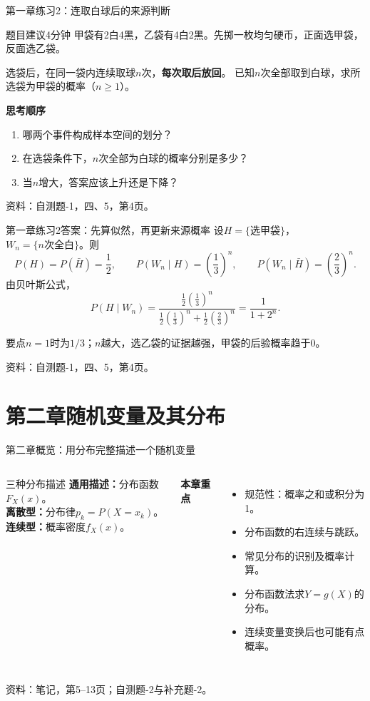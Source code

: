 \documentclass[aspectratio=169,10pt]{beamer}
\newcommand{\source}[1]{\vfill{\color{Muted}\fontsize{6.5}{8}\selectfont 资料：#1\par}}
\newcommand{\key}[1]{\begin{block}{要点}#1\end{block}}
\begin{document}
\begin{frame}[t]{第一章练习2：连取白球后的来源判断}
\begin{block}{题目\quad 建议4分钟}
甲袋有2白4黑，乙袋有4白2黑。先掷一枚均匀硬币，正面选甲袋，反面选乙袋。

选袋后，在同一袋内连续取球$n$次，\textbf{每次取后放回}。
已知$n$次全部取到白球，求所选袋为甲袋的概率（$n\ge1$）。
\end{block}
\vspace{2mm}
\textbf{思考顺序}
\begin{enumerate}
\item 哪两个事件构成样本空间的划分？
\item 在选袋条件下，$n$次全部为白球的概率分别是多少？
\item 当$n$增大，答案应该上升还是下降？
\end{enumerate}
\source{自测题-1，四、5，第4页。}
\end{frame}

\begin{answerframe}{第一章练习2答案：先算似然，再更新来源概率}
设$H=\{\text{选甲袋}\}$，$W_n=\{n\text{次全白}\}$。则
\[
P(H)=P(\bar H)=\frac12,\qquad
P(W_n\mid H)=\left(\frac13\right)^n,\qquad
P(W_n\mid\bar H)=\left(\frac23\right)^n.
\]
由贝叶斯公式，
\[
P(H\mid W_n)=\frac{\frac12(\frac13)^n}{\frac12(\frac13)^n+\frac12(\frac23)^n}
=\boxed{\frac1{1+2^n}}.
\]
\key{$n=1$时为$1/3$；$n$越大，选乙袋的证据越强，甲袋的后验概率趋于0。}
\source{自测题-1，四、5，第4页。}
\end{answerframe}

\section{第二章\quad 随机变量及其分布}

\begin{frame}[t]{第二章概览：用分布完整描述一个随机变量}
\begin{columns}[T]
\begin{block}{三种分布描述}
\textbf{通用描述：}分布函数$F_X(x)$。\\[3mm]
\textbf{离散型：}分布律$p_k=P(X=x_k)$。\\[3mm]
\textbf{连续型：}概率密度$f_X(x)$。
\end{block}
\textbf{本章重点}
\begin{itemize}
\item 规范性：概率之和或积分为1。
\item 分布函数的右连续与跳跃。
\item 常见分布的识别及概率计算。
\item 分布函数法求$Y=g(X)$的分布。
\item 连续变量变换后也可能有点概率。
\end{itemize}
\end{columns}
\source{笔记，第5--13页；自测题-2与补充题-2。}
\end{frame}
\end{document}
